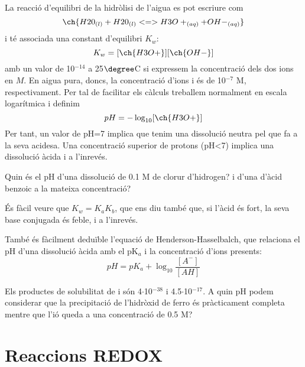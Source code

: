 La reacció d'equilibri de la hidròlisi de l'aigua es pot escriure com
\[\ch{H20_{(l)} + H20_{(l)} <=> H3O+_{(aq)} + OH-_{(aq)}}\]
i té associada una constant d'equilibri $K_w$:
\[K_w=[\ch{H3O+}][\ch{OH-}]\]
amb un valor de 10$^{-14}$ a 25${\degree}$C si expressem la concentració dels dos ions en $M$.
En aigua pura, doncs, la concentració d'ions  i  és de 10$^{-7}$ M, respectivament. 
Per tal de facilitar els càlculs treballem normalment en escala logarítmica i definim
\[pH = - \log_{10} [\ch{H3O+}]\]
Per tant, un valor de pH=7 implica que tenim una dissolució neutra pel que fa a la seva acidesa. Una concentració superior de protons (pH<7) implica una dissolució àcida i a l'inrevés.
 
\begin{exr}
Quin és el pH d'una dissolució de 0.1 M de clorur d'hidrogen? i d'una d'àcid benzoic a la mateixa concentració?
\end{exr}

És fàcil veure que $K_w=K_a K_b$, que ens diu també que, si l'àcid és fort, la seva base conjugada és feble, i a l'inrevés.

També és fàcilment deduïble l'equació de Henderson-Hasselbalch, que relaciona el pH d'una dissolució àcida amb el pK$_a$ i la concentració d'ions presents:
\[
pH = pK_a + \log_{10} \frac{[A^-]}{[AH]}
\]

\begin{exr}
Els productes de solubilitat de  i  són 4$\cdot$10$^{-38}$ i 4.5$\cdot$10$^{-17}$. A quin pH podem considerar que la precipitació de l'hidròxid de ferro és pràcticament completa mentre que l'ió  queda a una concentració de 0.5 M?
\end{exr}

%

\section{Reaccions REDOX}

